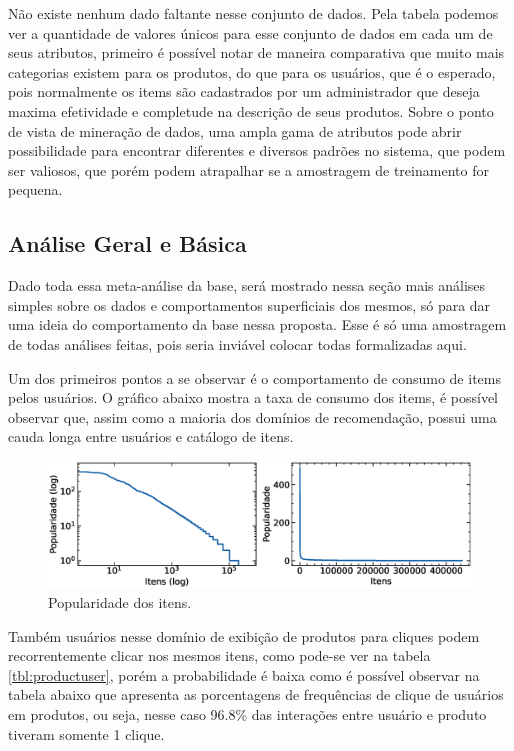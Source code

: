 \documentclass{article}
\begin{document}
Não existe nenhum dado faltante nesse conjunto de dados. Pela tabela podemos ver a quantidade de valores únicos para esse conjunto de dados em cada um de seus atributos, primeiro é possível notar de maneira comparativa que muito mais categorias existem para os produtos, do que para os usuários, que é o esperado, pois normalmente os items são cadastrados por um administrador que deseja maxima efetividade e completude na descrição de seus produtos. Sobre o ponto de vista de mineração de dados, uma ampla gama de atributos pode abrir possibilidade para encontrar diferentes e diversos padrões no sistema, que podem ser valiosos, que porém podem atrapalhar se a amostragem de treinamento for pequena.

\subsection{Análise Geral e Básica}

Dado toda essa meta-análise da base, será mostrado nessa seção mais análises simples sobre os dados e comportamentos superficiais dos mesmos, só para dar uma ideia do comportamento da base nessa proposta. Esse é só uma amostragem de todas análises feitas, pois seria inviável colocar todas formalizadas aqui.

Um dos primeiros pontos a se observar é o comportamento de consumo de items pelos usuários. O gráfico abaixo mostra a taxa de consumo dos items, é possível observar que, assim como a maioria dos domínios de recomendação, possui uma cauda longa entre usuários e catálogo de itens.

\begin{figure}[ht]
    \centering
    \includegraphics[width=1.00\textwidth]{items_pop.eps}
    \caption{Popularidade dos itens.}
    \label{fig:users}
\end{figure}

Também usuários nesse domínio de exibição de produtos para cliques podem recorrentemente clicar nos mesmos itens, como pode-se ver na tabela \ref{tbl:productuser}, porém a probabilidade é baixa como é possível observar na tabela abaixo que apresenta as porcentagens de frequências de clique de usuários em produtos, ou seja, nesse caso 96.8\% das interações entre usuário e produto tiveram somente 1 clique.
\end{document}
